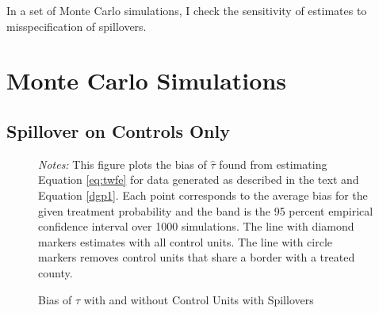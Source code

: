 \documentclass[11pt]{article}
\begin{document}
In a set of Monte Carlo simulations, I check the sensitivity of estimates to misspecification of spillovers.




\section{Monte Carlo Simulations}

\subsection{Spillover on Controls Only}

\begin{figure}[tb!]
    \caption{Bias of $\hat{\tau}$ with and without Control Units with Spillovers}
    \label{fig:bias_as_treat_prob}
    {\centering
    }

    {\footnotesize
        \textit{Notes:} This figure plots the bias of $\hat{\tau}$ found from estimating Equation \ref{eq:twfe} for data generated as described in the text and Equation \ref{dgp1}. Each point corresponds to the average bias for the given treatment probability and the band is the 95 percent empirical confidence interval over 1000 simulations. The line with diamond markers estimates with all control units. The line with circle markers removes control units that share a border with a treated county. 
    }
\end{figure}
\end{document}
